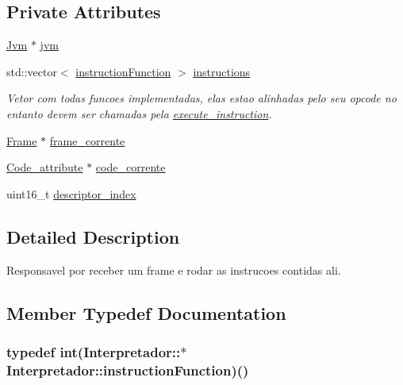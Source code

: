 \subsection*{Private Attributes}
\begin{DoxyCompactItemize}
\item 
\hyperlink{classJvm}{Jvm} $\ast$ \hyperlink{classInterpretador_aed3bd481ff345333414aa70360a94b7c}{jvm}
\item 
std\+::vector$<$ \hyperlink{classInterpretador_a0c7f1073259b205ff698b95db287e713}{instruction\+Function} $>$ \hyperlink{classInterpretador_a97cef3f8602b524716643a0395da46fe}{instructions}
\begin{DoxyCompactList}\small\item\em Vetor com todas funcoes implementadas, elas estao alinhadas pelo seu opcode no entanto devem ser chamadas pela \hyperlink{classInterpretador_a2bec82447756b2f6a43e68164ddbdde1}{execute\+\_\+instruction}. \end{DoxyCompactList}\item 
\hyperlink{classFrame}{Frame} $\ast$ \hyperlink{classInterpretador_a045818aa2a3f530ffb516d2bceac55a8}{frame\+\_\+corrente}
\item 
\hyperlink{attributes_8hpp_ad1d2692bc09d9023430faad186e7647e}{Code\+\_\+attribute} $\ast$ \hyperlink{classInterpretador_adc0e318d8cf9188ef597daeef754c1b9}{code\+\_\+corrente}
\item 
uint16\+\_\+t \hyperlink{classInterpretador_a1689e627d6bbc165db98b1c3df67fc60}{descriptor\+\_\+index}
\end{DoxyCompactItemize}


\subsection{Detailed Description}
Responsavel por receber um frame e rodar as instrucoes contidas ali. 

\subsection{Member Typedef Documentation}
\hypertarget{classInterpretador_a0c7f1073259b205ff698b95db287e713}{
\subsubsection[{instruction\+Function}]{\setlength{\rightskip}{0pt plus 5cm}typedef int(Interpretador\+::$\ast$ Interpretador\+::instruction\+Function)()\hspace{0.3cm}{\ttfamily [private]}}}\label{classInterpretador_a0c7f1073259b205ff698b95db287e713}


